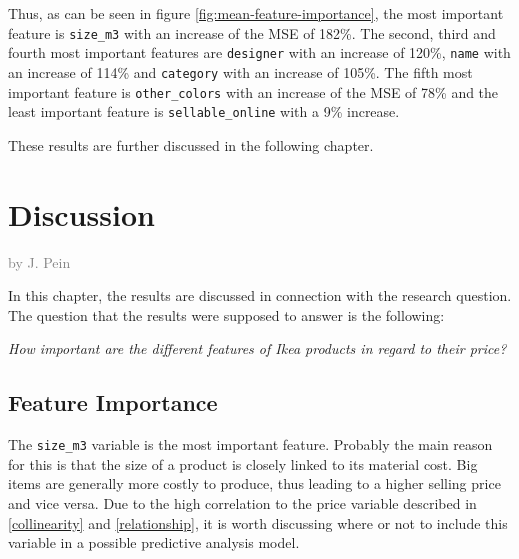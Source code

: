 \documentclass[a4paper, nobind]{templates/ociamthesis}
\begin{document}
Thus, as can be seen in figure \ref{fig:mean-feature-importance}, the most important feature is \texttt{size\_m3} with an increase of the MSE of 182\%. The second, third and fourth most important features are \texttt{designer} with an increase of 120\%, \texttt{name} with an increase of 114\% and \texttt{category} with an increase of 105\%. The fifth most important feature is \texttt{other\_colors} with an increase of the MSE of 78\% and the least important feature is \texttt{sellable\_online} with a 9\% increase.

These results are further discussed in the following chapter.

\hypertarget{discussion}{%
\chapter{Discussion}\label{discussion}}

\hfill\textcolor{gray}{by J. Pein}

In this chapter, the results are discussed in connection with the research question. The question that the results were supposed to answer is the following:

\emph{How important are the different features of Ikea products in regard to their price?}

\hypertarget{feature-importance-1}{%
\section{Feature Importance}\label{feature-importance-1}}

The \texttt{size\_m3} variable is the most important feature. Probably the main reason for this is that the size of a product is closely linked to its material cost. Big items are generally more costly to produce, thus leading to a higher selling price and vice versa. Due to the high correlation to the price variable described in \ref{collinearity} and \ref{relationship}, it is worth discussing where or not to include this variable in a possible predictive analysis model.
\end{document}

